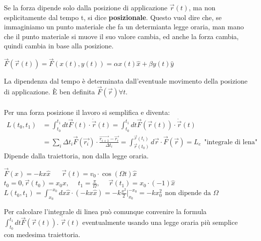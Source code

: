 Se la forza dipende solo dalla posizione di applicazione $\vec{r}(t)$, ma non esplicitamente dal tempo t, si dice \textbf{posizionale}. Questo vuol
dire che, se immaginiamo un punto materiale che fa un determianta legge oraria, man mano che il punto materiale si muove il suo valore cambia, ed anche la forza 
cambia, quindi cambia in base alla posizione.
\begin{example}
    $\vec{F}(\vec{r}(t)) = \vec{F}(x(t), y(t)) = \alpha x(t) \hat{x} + \beta y(t) \hat{y}$
\end{example}
\hspace{-15pt}La dipendenza dal tempo è determinata dall'eventuale movimento della posizione di applicazione. È ben definita $\vec{F}(\vec{r}) \forall t$. \\\\
Per una forza posizione il lavoro si semplifica e diventa:
\begin{equation*}
    \begin{split}
        L(t_0, t_1) & = \int_{t_0}^{t_1}dt \vec{F}(t) \cdot \dot{\vec{r}}(t) = \int_{t_0}^{t_1}dt \vec{F}(\vec{r}(t)) \cdot \dot{\vec{r}}(t) \\
                    & = \sum_i \Delta t_i \vec{F}(\vec{r_i}) \cdot \frac{\vec{r_{i+1}} - \vec{r_i}}{\Delta t_i} = \int_{\vec{r}(t_0 )}^{\vec{r}(t_i)} d\vec{r}\cdot \vec{F}(\vec{r}) = L_e \:\:\text{"integrale di lena"}
    \end{split}
\end{equation*}
Dipende dalla traiettoria, non dalla legge oraria.
\begin{example}
    $\vec{F}(x)= -kx\hat{x} \hspace{20pt} \vec{r}(t) = v_0 \cdot \cos(\Omega t)\hat{x}$\\
    $t_0 = 0, \vec{r}(t_0) = x_0 \hat{x}, \hspace{15pt} t_1 = \frac{\pi}{\Omega}, \hspace{15pt} \vec{r}(t_1) = x_0 \cdot (-1)\hat{x}$\\
    $L(t_0, t_1) = \int_{x_0}^{-x_0}dx \hat{x} \cdot (-kx\hat{x}) = -k \frac{x^2}{2} |_{x_0}^{-x_0} = -k x_0^2 \:\: \text{non dipende da }\Omega$
\end{example}
\begin{observation}
    Per calcolare l'integrale di linea può comunque convenire la formula $\int_{t_0}^{t_1}dt \vec{F}(\vec{r}(t))$. 
    $\dot{\vec{r}}(t)$ eventualmente usando una legge oraria più semplice con medesima traiettoria.
\end{observation}
